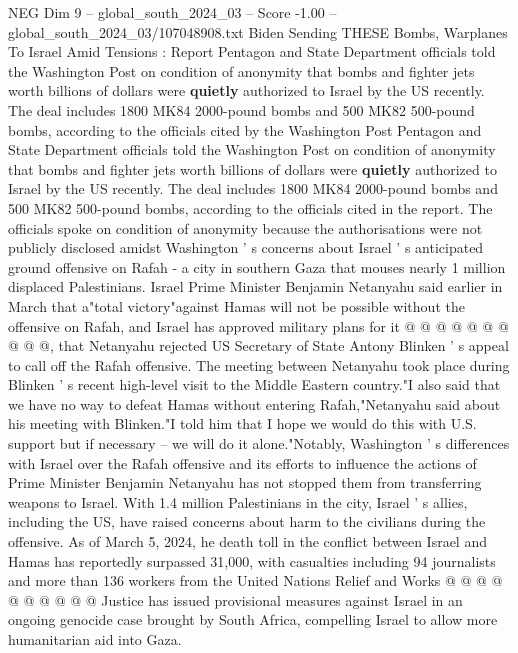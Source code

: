 \begin{textsample}{NEG Dim 9 – global\_south\_2024\_03 – Score -1.00 – global\_south\_2024\_03/107048908.txt}  \label{ex:f9_neg_411}
Biden Sending THESE Bombs, Warplanes To Israel Amid Tensions : Report Pentagon and State Department officials told the Washington Post on condition of anonymity that bombs and fighter jets worth billions of dollars were \textbf{quietly} authorized to Israel by the US recently.
The deal includes 1800 MK84 2000-pound bombs and 500 MK82 500-pound bombs, according to the officials cited by the Washington Post Pentagon and State Department officials told the Washington Post on condition of anonymity that bombs and fighter jets worth billions of dollars were \textbf{quietly} authorized to Israel by the US recently.
The deal includes 1800 MK84 2000-pound bombs and 500 MK82 500-pound bombs, according to the officials cited in the report.
The officials spoke on condition of anonymity because the authorisations were not publicly disclosed amidst Washington ' s concerns about Israel ' s anticipated ground offensive on Rafah - a city in southern Gaza that mouses nearly 1 million displaced Palestinians.
Israel Prime Minister Benjamin Netanyahu said earlier in March that a"total victory"against Hamas will not be possible without the offensive on Rafah, and Israel has approved military plans for it @ @ @ @ @ @ @ @ @ @, that Netanyahu rejected US Secretary of State Antony Blinken ' s appeal to call off the Rafah offensive.
The meeting between Netanyahu took place during Blinken ' s recent high-level visit to the Middle Eastern country."I also said that we have no way to defeat Hamas without entering Rafah,"Netanyahu said about his meeting with Blinken."I told him that I hope we would do this with U.S. support but if necessary -- we will do it alone."Notably, Washington ' s differences with Israel over the Rafah offensive and its efforts to influence the actions of Prime Minister Benjamin Netanyahu has not stopped them from transferring weapons to Israel.
With 1.4 million Palestinians in the city, Israel ' s allies, including the US, have raised concerns about harm to the civilians during the offensive.
As of March 5, 2024, he death toll in the conflict between Israel and Hamas has reportedly surpassed 31,000, with casualties including 94 journalists and more than 136 workers from the United Nations Relief and Works @ @ @ @ @ @ @ @ @ @ Justice has issued provisional measures against Israel in an ongoing genocide case brought by South Africa, compelling Israel to allow more humanitarian aid into Gaza.

\end{textsample}
